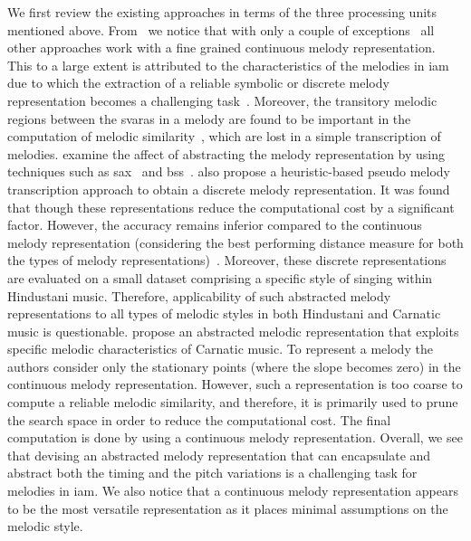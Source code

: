 We first review the existing approaches in terms of the three processing units mentioned above. From~ we notice that with only a couple of exceptions~\citep{Ross2012b,ganguli2015efficient} all other approaches work with a fine grained continuous melody representation. This to a large extent is attributed to the characteristics of the melodies in \gls{iam} due to which the extraction of a reliable symbolic or discrete melody representation becomes a challenging task~\citep{widdess1994involving}. Moreover, the transitory melodic regions between the \glspl{svara} in a melody are found to be important in the computation of melodic similarity~\citep{Datta2007,gupta2012objective}, which are lost in a simple transcription of melodies. \cite{Ross2012b,ganguli2015efficient} examine the affect of abstracting the melody representation by using techniques such as \gls{sax}~\citep{Lin2003} and \gls{bss}~\citep{tanaka2005discovery}. \cite{ganguli2015efficient} also propose a heuristic-based pseudo melody transcription approach to obtain a discrete melody representation. It was found that though these representations reduce the computational cost by a significant factor. However, the accuracy remains inferior compared to the continuous melody representation (considering the best performing distance measure for both the types of melody representations)~\cite{Ross2012b,ganguli2015efficient}. Moreover, these discrete representations are evaluated on a small dataset comprising a specific style of singing within Hindustani music. Therefore, applicability of such abstracted melody representations to all types of melodic styles in both Hindustani and Carnatic music is questionable. \cite{Ishwar2013,Dutta2014,dutta2014modified} propose an abstracted melodic representation that exploits specific melodic characteristics of Carnatic music. To represent a melody the authors consider only the stationary points (where the slope becomes zero) in the continuous melody representation. However, such a representation is too coarse to compute a reliable melodic similarity, and therefore, it is primarily used to prune the search space in order to reduce the computational cost. The final computation is done by using a continuous melody representation. Overall, we see that devising an abstracted melody representation that can encapsulate and abstract both the timing and the pitch variations is a challenging task for melodies in \gls{iam}. We also notice that a continuous melody representation appears to be the most versatile representation as it places minimal assumptions on the melodic style. 


